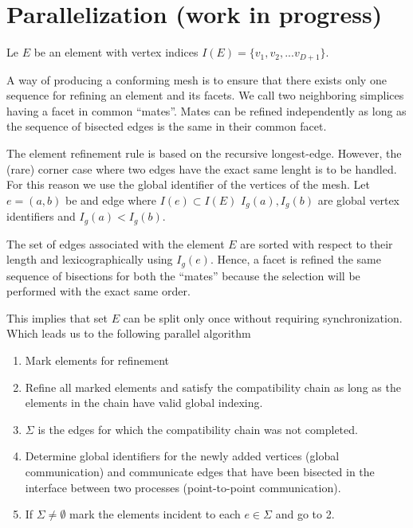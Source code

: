 \documentclass{article}
\begin{document}




\section{Parallelization (work in progress)}

Le $E$ be an element with vertex indices $I(E) = \{v_1, v_2, ... v_{D+1} \}$.

A way of producing a conforming mesh is to ensure that there exists only one sequence for refining an 
element and its facets. We call two neighboring simplices having a facet in common ``mates''.
Mates can be refined independently as long as the sequence of bisected edges is the same in their
common facet. 


The element refinement rule is based on the recursive longest-edge. However, the (rare) corner case where two edges have the exact same lenght is to be handled. For this reason we use the global identifier of the vertices of the mesh.
Let $e = (a, b)$ be and edge where $I(e) \subset I(E)$ $I_g(a), I_g(b)$ are global vertex identifiers and $I_g(a) < I_g(b)$. 

The set of edges associated with the element $E$ are sorted with respect to their length and lexicographically using $I_g(e)$. Hence, a facet is refined the same sequence of bisections for both the ``mates'' because the selection will be performed with the exact same order.

This implies that set $E$ can be split only once without requiring synchronization. Which leads us to the following parallel algorithm

\begin{enumerate}
	\item Mark elements for refinement
	\item Refine all marked elements and satisfy the compatibility chain as long as the elements in the chain have valid global indexing.
	\item $\Sigma$ is the edges for which the compatibility chain was not completed.
	\item Determine global identifiers for the newly added vertices (global communication) and communicate edges that have been bisected in the interface between two processes (point-to-point communication). 
	\item If $\Sigma \neq \emptyset$ mark the elements incident to each $e \in \Sigma$ and go to 2.
\end{enumerate}
\end{document}
